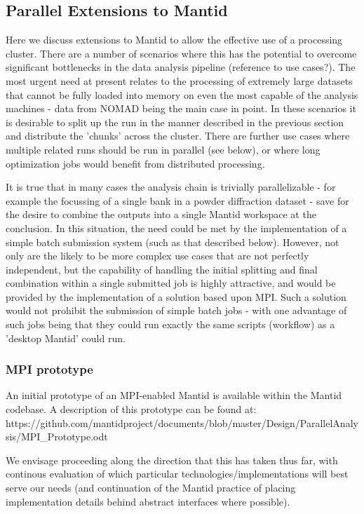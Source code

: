 \subsection{Parallel Extensions to Mantid}
\label{subsec:ParallelExtensions}

Here we discuss extensions to Mantid to allow the effective use of a processing cluster. There are a number of scenarios where this has the potential to overcome significant bottlenecks in the data analysis pipeline (reference to use cases?). The most urgent need at present relates to the processing of extremely large datasets that cannot be fully loaded into memory on even the most capable of the analysis machines - data from NOMAD being the main case in point. In these scenarios it is desirable to split up the run in the manner described in the previous section and distribute the 'chunks' across the cluster. There are further use cases where multiple related runs should be run in parallel (see below), or where long optimization jobs would benefit from distributed processing.

It is true that in many cases the analysis chain is trivially parallelizable - for example the focussing of a single bank in a powder diffraction dataset - save for the desire to combine the outputs into a single Mantid workspace at the conclusion. In this situation, the need could be met by the implementation of a simple batch submission system (such as that described below). However, not only are the likely to be more complex use cases that are not perfectly independent, but the capability of handling the initial splitting and final combination within a single submitted job is highly attractive, and would be provided by the implementation of a solution based upon MPI. 
Such a solution would not prohibit the submission of simple batch jobs - with one advantage of such jobs being that they could run exactly the same scripts (workflow) as a 'desktop Mantid' could run.

\subsubsection{MPI prototype}

An initial prototype of an MPI-enabled Mantid is available within the Mantid codebase. A description of this prototype can be found at: https://github.com/mantidproject/documents/blob/master/Design/ParallelAnalysis/MPI\_Prototype.odt

We envisage proceeding along the direction that this has taken thus far, with continous evaluation of which particular technologies/implementations will best serve our needs (and continuation of the Mantid practice of placing implementation details behind abstract interfaces where possible).

